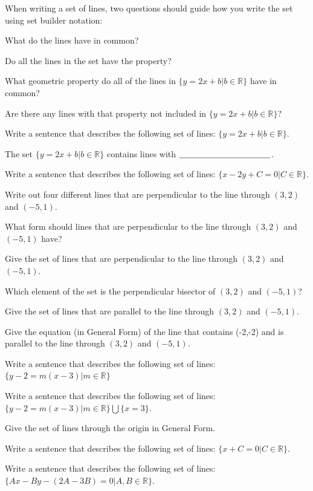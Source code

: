When writing a set of lines, two questions should guide how you write the set using set builder notation:
\be
\item What do the lines have in common?
\item Do all the lines in the set have the property?
\ee

\bq \be
\item What geometric property do all of the lines in $\{ y=2x+b| b \in \mathbb{R}\}$ have in common?
\item Are there any lines with that property not included in $\{ y=2x+b| b \in \mathbb{R}\}$?
\item Write a sentence that describes the following set of lines: $\{ y=2x+b| b \in \mathbb{R}\}$.

The set $\{ y=2x+b| b \in \mathbb{R}\}$ contains lines with $\underline{\hspace{1.5in}}$.
\ee
\eq

\bq Write a sentence that describes the following set of lines: $\{ x-2y+C=0| C \in \mathbb{R}\}$.
\eq

\bq
\be
\item Write out four different lines that are perpendicular to the line through $(3,2)$ and $(-5,1)$.
\item What form should lines that are perpendicular to the line through $(3,2)$ and $(-5,1)$ have?
\item Give the set of lines that are perpendicular to the line through $(3,2)$ and $(-5,1)$.
\item Which element of the set is the perpendicular bisector of $(3,2)$ and $(-5,1)$?
\ee
\eq


\bq Give the set of lines that are parallel to the line through $(3,2)$ and $(-5,1)$.
\eq

\bq Give the equation (in General Form) of the line that contains (-2,-2) and is parallel to the line through $(3,2)$ and $(-5,1)$.
\eq

\bq Write a sentence that describes the following set of lines: $\{ y-2=m(x-3)| m \in \mathbb{R}\}$
\eq

\bq Write a sentence that describes the following set of lines: $\{ y-2=m(x-3)| m \in \mathbb{R}\} \bigcup \{x=3\}$.
\eq

\bq Give the set of lines through the origin in General Form.
\eq

\bq Write a sentence that describes the following set of lines: $\{ x+C=0| C \in \mathbb{R}\}$.
\eq

\bq Write a sentence that describes the following set of lines: $\{ Ax-By-(2A-3B)=0| A,B \in \mathbb{R} \}$.
\eq

